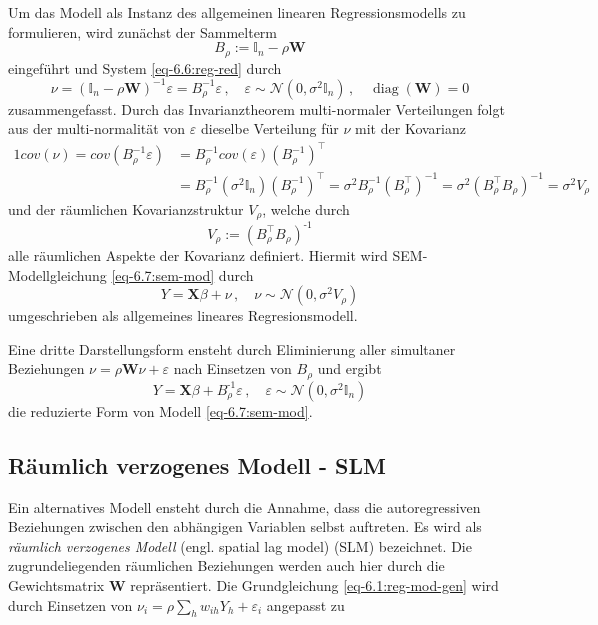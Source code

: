 Um das Modell als Instanz des allgemeinen linearen Regressionsmodells zu formulieren,
wird zunächst der Sammelterm
\begin{equation}
    B_{\rho} := \mathds{I}_{n} - \rho \mathbf{W}
\end{equation}
eingeführt und System \eqref{eq-6.6:reg-red} durch
\begin{equation}
    \nu=(\mathds{I}_{n} -\rho \mathbf{W})^{-1} \varepsilon=B_{\rho}^{-1} \varepsilon \, , \quad 
    \varepsilon \sim \mathcal{N}(0,\sigma^{2} \mathds{I}_{n}) \, , \quad \operatorname{diag}(\mathbf{W})=0    
\end{equation}
zusammengefasst.
Durch das Invarianztheorem multi-normaler Verteilungen folgt aus der 
multi-normalität von $\varepsilon$ dieselbe Verteilung für $\nu$ mit der Kovarianz
\begin{alignat*}{1}
    cov(\nu)=cov(B_{\rho}^{-1} \varepsilon) 
    & = B_{\rho}^{-1} cov(\varepsilon) (B_{\rho}^{-1})^{\top} \\
    & = B_{\rho}^{-1} (\sigma^{2} \mathds{I}_{n}) (B_{\rho}^{-1})^{\top}=
    \sigma^{2} B_{\rho}^{-1} (B_{\rho}^{\top})^{-1}=
    \sigma^{2} (B_{\rho}^{\top} B_{\rho})^{-1} =\sigma^{2} V_{\rho}
\end{alignat*}
und der räumlichen Kovarianzstruktur $V_{\rho}$, welche durch
\begin{equation}
    V_{\rho} := (B_{\rho}^{\top} B_{\rho})^{\text{-1}}
\end{equation}
alle räumlichen Aspekte der Kovarianz definiert. Hiermit wird 
SEM-Modellgleichung \eqref{eq-6.7:sem-mod} durch 
\begin{equation} \label{eq-6.8:sem-mod2}
    Y=\mathbf{X} \beta + \nu \, , \quad 
    \nu \sim \mathcal{N}(0,\sigma^{2} {V}_{\rho})
\end{equation}
umgeschrieben als allgemeines lineares Regresionsmodell.

Eine dritte Darstellungsform ensteht durch Eliminierung 
aller simultaner Beziehungen $\nu=\rho \mathbf{W} \nu + \varepsilon$ 
nach Einsetzen von $B_{\rho}$ und ergibt 
\begin{equation}
    Y=\mathbf{X} \beta + B_{\rho}^{\text{-1}} \varepsilon \, , \quad 
    \varepsilon \sim \mathcal{N}(0,\sigma^{2} \mathds{I}_{n})
\end{equation}
die reduzierte Form von Modell \eqref{eq-6.7:sem-mod}. 


\subsection{Räumlich verzogenes Modell - SLM}
Ein alternatives Modell ensteht durch die Annahme, 
dass die autoregressiven Beziehungen zwischen den abhängigen Variablen 
selbst auftreten. Es wird als \emph{räumlich verzogenes Modell} 
(engl. spatial lag model) (SLM) bezeichnet. 
Die zugrundeliegenden räumlichen Beziehungen werden auch hier 
durch die Gewichtsmatrix $\mathbf{W}$ repräsentiert. Die Grundgleichung \eqref{eq-6.1:reg-mod-gen}
wird durch Einsetzen von $\nu_{i}=\rho \sum_{h} w_{ih}Y_{h}+\varepsilon_{i}$ angepasst zu 

